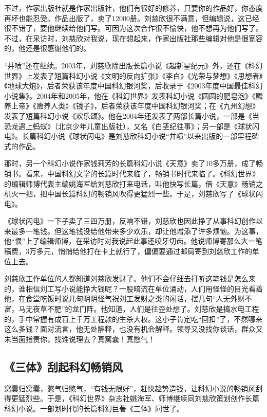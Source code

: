 \documentclass[fontset=fandol,12pt,a5paper]{ctexbook}
\begin{document}
不过，作家出版社就是作家出版社，他们有很好的修养，只要你的作品好，你态度再坏也能忍受。作品出版了，卖了12000册。刘慈欣很不满意，但编辑说，这已经很不错了，要他继续给他们写。可因为这次合作很不愉快，他不想再为他们写了。不过，在采访时，刘慈欣对我说，现在想起来，作家出版社那些编辑对他是很宽容的，他还是很感谢他们的。

“井喷”还在继续。2003年，刘慈欣除出版长篇小说《超新星纪元》外，还在《科幻世界》上发表了短篇科幻小说《文明的反向扩张》《李白》《光荣与梦想》《思想者》《地球大炮》，后者荣获该年度中国科幻银河奖，后收录于《2003年度中国最佳科幻小说集》。2004年和2005年，他在《科幻世界》发表科幻小说《圆圆的肥皂泡》《赡养上帝》《赡养人类》《镜子》，后者荣获该年度中国科幻银河奖；在《九州幻想》发表了短篇科幻小说《欢乐颂》。他在2004年还发表了两部长篇小说，一部是《当恐龙遇上蚂蚁》（北京少年儿童出版社），又名《白垩纪往事》；另一部是《球状闪电》。长篇科幻小说《球状闪电》是刘慈欣科幻小说“井喷”以来出版的一部里程碑式的作品。

那时，另一个科幻小说作家钱莉芳的长篇科幻小说《天意》卖了10多万册，成了畅销书。看来，中国科幻文学的长篇时代来临了，畅销书时代来临了。《科幻世界》的编辑师博代表主编姚海军给刘慈欣打来电话，叫他快写长篇，借《天意》畅销之机火一把，把中国长篇科幻的畅销风吹得更猛烈一些。于是，刘慈欣写了《球状闪电》。

《球状闪电》一下子卖了三四万册，反响不错，刘慈欣也因此挣了从事科幻创作以来最多一笔钱。但这笔钱没给他带来多少欢乐，却让他增添了许多烦恼。为这事，他“恨”上了编辑师博，在采访时对我说起此事还咬牙切齿。他说师博寄那么大一笔稿费，3万多元，悄悄给他打在卡上就行了，偏偏要通过邮局寄到刘慈欣工作的单位上去。

刘慈欣工作单位的人都知道刘慈欣发财了。他们不会仔细去打听这笔钱是怎么来的，谁相信刘工写小说能挣大钱呢？一股暗流在单位涌动，人们用怪怪的目光看着他，在食堂吃饭时说几句阴阴怪气祝刘工发财之类的闲话，摆几句“人无外财不富，马无夜草不肥”的龙门阵。他知道，人们是往歪处想了。刘慈欣是搞水电工程的，手中常握有成百上千万工程款的生杀大权。这小子肯定吃“回扣”了，不然哪来这么多钱？面对流言，他无处解释，也没有机会解释。领导又没找你谈话，群众又未当面指责你，找谁说理去？真窝囊！真憋气！

\subsection{《三体》刮起科幻畅销风}

窝囊归窝囊，憋气归憋气，“有钱无限好”，赶快趁势造钱，让科幻小说的畅销风刮得更猛烈些。于是，《科幻世界》杂志社姚海军、师博继续同刘慈欣策划创作长篇科幻小说。一部划时代的长篇科幻巨著《三体》问世了。
\end{document}
